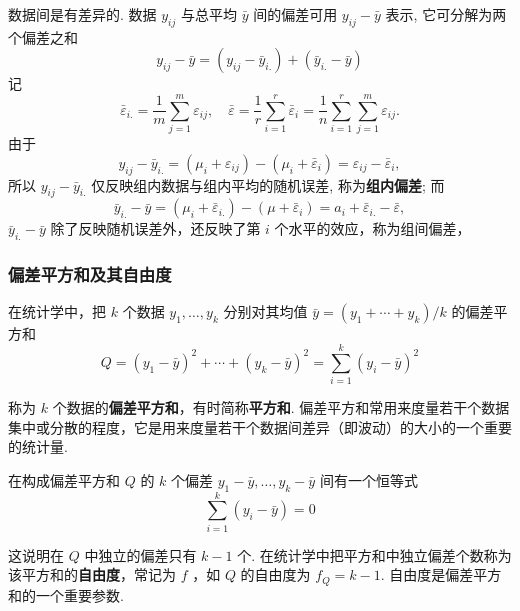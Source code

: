 数据间是有差异的. 数据 $y_{ij}$ 与总平均 $\bar{y}$ 间的偏差可用 $y_{ij} - \bar{y}$ 表示, 它可分解为两个偏差之和
\begin{equation}\label{eq:8.1.10}
  y_{ij}-\bar{y}=(y_{ij}-\bar{y}_{i.})+(\bar{y}_{i.}-\bar{y})
\end{equation}
记
\begin{equation*}
  \bar{\varepsilon}_{i.} =\frac{1}{m} \sum_{j=1}^{m} \varepsilon_{ij}, \quad \bar{\varepsilon}=\frac{1}{r} \sum_{i=1}^{r} \bar{\varepsilon}_{i} = \frac{1}{n} \sum_{i=1}^{r} \sum_{j=1}^{m} \varepsilon_{ij}.
\end{equation*}
由于
\begin{equation}\label{eq:8.1.11}
  y_{i j}-\bar{y}_{i.}=(\mu_{i}+\varepsilon_{i j})-(\mu_{i}+\bar{\varepsilon}_{i})=\varepsilon_{i j}-\bar{\varepsilon}_{i},
\end{equation}
所以 $y_{ij} - \bar{y}_{i.}$ 仅反映组内数据与组内平均的随机误差, 称为\textbf{组内偏差}; 而
\begin{equation}\label{eq:8.1.12}
  \bar{y}_{i.}-\bar{y} = (\mu_{i}+ \bar{\varepsilon}_{i.})-(\mu +\bar{\varepsilon}_{i})= a_i + \bar{\varepsilon}_{i.}-\bar{\varepsilon},
\end{equation}
$\bar{y}_{i.} - \bar{y}$ 除了反映随机误差外，还反映了第 $i$ 个水平的效应，称为组间偏差，

\subsubsection{偏差平方和及其自由度}

在统计学中，把 $k$ 个数据 $y_1,\ldots,y_k$ 分别对其均值 $\bar{y}=(y_1+\cdots+y_{k}) / k$ 的偏差平方和
\begin{equation*}
  Q=\left(y_{1}-\bar{y}\right)^{2}+\cdots+\left(y_{k}-\bar{y}\right)^{2}=\sum_{i=1}^{k}\left(y_{i}-\bar{y}\right)^{2}
\end{equation*}

称为 $k$ 个数据的\textbf{偏差平方和}，有时简称\textbf{平方和}. 偏差平方和常用来度量若干个数据集中或分散的程度，它是用来度量若干个数据间差异（即波动）的大小的一个重要的统计量.

在构成偏差平方和 $Q$ 的 $k$ 个偏差 $y_1 - \bar{y}, \ldots, y_{k} - \bar{y}$ 间有一个恒等式
\begin{equation*}
  \sum_{i=1}^{k}\left(y_{i}-\bar{y}\right)=0
\end{equation*}

这说明在 $Q$ 中独立的偏差只有 $k-1$ 个. 在统计学中把平方和中独立偏差个数称为该平方和的\textbf{自由度}，常记为 $f$ ，如 $Q$ 的自由度为 $f_{Q}=k-1$. 自由度是偏差平方和的一个重要参数.

